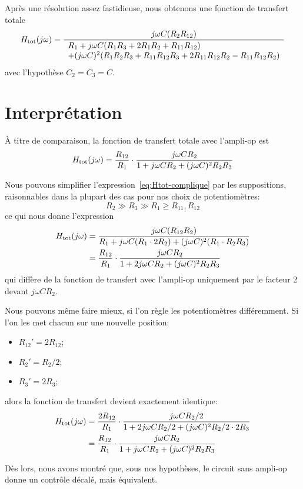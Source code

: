 Après une résolution assez fastidieuse, nous obtenons une fonction de transfert
totale
\begin{equation} \label{eq:Htot-complique}
    H_{\mathrm{tot}}(j\omega) = \frac{j\omega C(R_2R_{12})}
    {\begin{array}{l}
            R_1 + j\omega C(R_1R_3+2R_1R_2+R_{11}R_{12})\\
        + (j\omega C)^2(R_1R_2R_3 + R_{11}R_{12}R_3 + 2R_{11}R_{12}R_2
        - R_{11}R_{12}R_2)
\end{array}}
\end{equation}
avec l'hypothèse $C_2 = C_3 = C$.

\section{Interprétation}

À titre de comparaison, la fonction de transfert totale avec l'ampli-op est
\begin{equation}
    H_{\mathrm{tot}}(j\omega) = \frac{R_{12}}{R_1}\cdot
    \frac{j\omega CR_2}
    {1+j\omega CR_2 + (j\omega C)^2R_2R_3}
\end{equation}

Nous pouvons simplifier l'expression~\eqref{eq:Htot-complique}
par les suppositions, raisonnables dans la plupart des cas
pour nos choix de potentiomètres:
\begin{equation}
    R_2 \gg R_3 \gg R_1 \geq R_{11},R_{12}
\end{equation}
ce qui nous donne l'expression
\begin{equation}
    \begin{split}
        H_{\mathrm{tot}}(j\omega) &= \frac{j\omega C (R_{12} R_2)}
        {R_1 + j\omega C(R_1\cdot 2R_2) + (j\omega C)^2(R_1\cdot R_2R_3)} \\
        &= \frac{R_{12}}{R_1}\cdot
        \frac{j\omega C R_2}{1+2j\omega CR_2 + (j\omega C)^2R_2R_3}
    \end{split}
\end{equation}
qui diffère de la fonction de transfert avec l'ampli-op uniquement
par le facteur 2 devant $j\omega CR_2$.

Nous pouvons même faire mieux,
si l'on règle les potentiomètres différemment.
Si l'on les met chacun sur une nouvelle position:
\begin{itemize}
    \item $R_{12}' = 2R_{12}$;
    \item $R_2' = R_2/2$;
    \item $R_3' = 2R_3$;
\end{itemize}
alors la fonction de transfert devient exactement identique:
\begin{equation}
    \begin{split}
        H_{\mathrm{tot}}(j\omega) &= \frac{2R_{12}}{R_1} \cdot\frac{j\omega C R_2/2}
        {1+2j\omega CR_2/2 + (j\omega C)^2R_2/2\cdot 2R_3}\\
        &= \frac{R_{12}}{R_1}\cdot\frac{j\omega CR_2}
        {1+j\omega CR_2 + (j\omega C)^2R_2R_3}
    \end{split}
\end{equation}

Dès lors, nous avons montré que, sous nos hypothèses, le circuit sans ampli-op
donne un contrôle décalé, mais équivalent.
